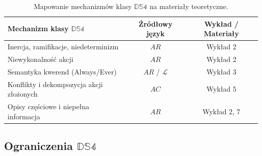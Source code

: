 \documentclass[11pt,a4paper]{article}
\theoremstyle{definition}
\begin{document}
\begin{table}[h!]
\centering
\caption{Mapowanie mechanizmów klasy $\mathbb{DS4}$ na materiały teoretyczne.}
\label{tab:mapowanie_ds4}
\begin{tabular}{|l|c|c|}
\hline
\textbf{Mechanizm klasy $\mathbb{DS4}$} & \textbf{Źródłowy język} & \textbf{Wykład / Materiały} \\ \hline
Inercja, ramifikacje, niedeterminizm & $AR$ & Wykład 2 \\ \hline
Niewykonalność akcji & $AR$ & Wykład 2 \\ \hline
Semantyka kwerend (Always/Ever) & $AR$ / $\mathcal{L}$ & Wykład 3 \\ \hline
Konflikty i dekompozycja akcji złożonych & $AC$ & Wykład 5 \\ \hline
Opisy częściowe i niepełna informacja & $AR$ & Wykład 2, 7 \\ \hline
\end{tabular}
\end{table}

\subsection{Ograniczenia \texorpdfstring{$\mathbb{DS4}$}{DS4}}
\end{document}
